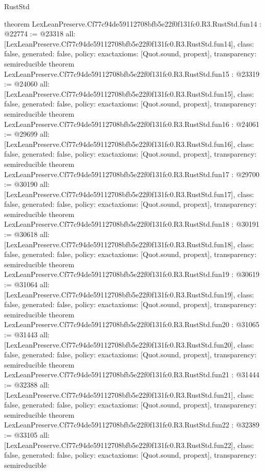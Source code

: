 \begin{lexlean}{RustStd}
\begin{coremodule}
{}
theorem LexLeanPreserve.Cf77c94de59112708bfb5e22f0f131fc0.R3.RustStd.fun14 : @22774 := @23318 {
  all: [LexLeanPreserve.Cf77c94de59112708bfb5e22f0f131fc0.R3.RustStd.fun14],
  class: false,
  generated: false,
  policy: exact{axioms: [Quot.sound, propext]},
  transparency: semireducible
}
theorem LexLeanPreserve.Cf77c94de59112708bfb5e22f0f131fc0.R3.RustStd.fun15 : @23319 := @24060 {
  all: [LexLeanPreserve.Cf77c94de59112708bfb5e22f0f131fc0.R3.RustStd.fun15],
  class: false,
  generated: false,
  policy: exact{axioms: [Quot.sound, propext]},
  transparency: semireducible
}
theorem LexLeanPreserve.Cf77c94de59112708bfb5e22f0f131fc0.R3.RustStd.fun16 : @24061 := @29699 {
  all: [LexLeanPreserve.Cf77c94de59112708bfb5e22f0f131fc0.R3.RustStd.fun16],
  class: false,
  generated: false,
  policy: exact{axioms: [Quot.sound, propext]},
  transparency: semireducible
}
theorem LexLeanPreserve.Cf77c94de59112708bfb5e22f0f131fc0.R3.RustStd.fun17 : @29700 := @30190 {
  all: [LexLeanPreserve.Cf77c94de59112708bfb5e22f0f131fc0.R3.RustStd.fun17],
  class: false,
  generated: false,
  policy: exact{axioms: [Quot.sound, propext]},
  transparency: semireducible
}
theorem LexLeanPreserve.Cf77c94de59112708bfb5e22f0f131fc0.R3.RustStd.fun18 : @30191 := @30618 {
  all: [LexLeanPreserve.Cf77c94de59112708bfb5e22f0f131fc0.R3.RustStd.fun18],
  class: false,
  generated: false,
  policy: exact{axioms: [Quot.sound, propext]},
  transparency: semireducible
}
theorem LexLeanPreserve.Cf77c94de59112708bfb5e22f0f131fc0.R3.RustStd.fun19 : @30619 := @31064 {
  all: [LexLeanPreserve.Cf77c94de59112708bfb5e22f0f131fc0.R3.RustStd.fun19],
  class: false,
  generated: false,
  policy: exact{axioms: [Quot.sound, propext]},
  transparency: semireducible
}
theorem LexLeanPreserve.Cf77c94de59112708bfb5e22f0f131fc0.R3.RustStd.fun20 : @31065 := @31443 {
  all: [LexLeanPreserve.Cf77c94de59112708bfb5e22f0f131fc0.R3.RustStd.fun20],
  class: false,
  generated: false,
  policy: exact{axioms: [Quot.sound, propext]},
  transparency: semireducible
}
theorem LexLeanPreserve.Cf77c94de59112708bfb5e22f0f131fc0.R3.RustStd.fun21 : @31444 := @32388 {
  all: [LexLeanPreserve.Cf77c94de59112708bfb5e22f0f131fc0.R3.RustStd.fun21],
  class: false,
  generated: false,
  policy: exact{axioms: [Quot.sound, propext]},
  transparency: semireducible
}
theorem LexLeanPreserve.Cf77c94de59112708bfb5e22f0f131fc0.R3.RustStd.fun22 : @32389 := @33105 {
  all: [LexLeanPreserve.Cf77c94de59112708bfb5e22f0f131fc0.R3.RustStd.fun22],
  class: false,
  generated: false,
  policy: exact{axioms: [Quot.sound, propext]},
  transparency: semireducible
}
\end{coremodule}
\end{lexlean}
